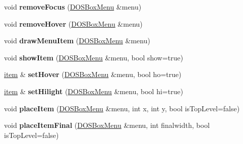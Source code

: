 \begin{DoxyCompactItemize}
\item 
\hypertarget{classDOSBoxMenu_1_1item_acf113ce470d96ee0f12aff8649057d63}{void {\bfseries remove\-Focus} (\hyperlink{classDOSBoxMenu}{D\-O\-S\-Box\-Menu} \&menu)}\label{classDOSBoxMenu_1_1item_acf113ce470d96ee0f12aff8649057d63}

\item 
\hypertarget{classDOSBoxMenu_1_1item_a8e061c47fb38142eef8151d50b0c747d}{void {\bfseries remove\-Hover} (\hyperlink{classDOSBoxMenu}{D\-O\-S\-Box\-Menu} \&menu)}\label{classDOSBoxMenu_1_1item_a8e061c47fb38142eef8151d50b0c747d}

\item 
\hypertarget{classDOSBoxMenu_1_1item_a9560e3719d6f6e0df9cf245765d95090}{void {\bfseries draw\-Menu\-Item} (\hyperlink{classDOSBoxMenu}{D\-O\-S\-Box\-Menu} \&menu)}\label{classDOSBoxMenu_1_1item_a9560e3719d6f6e0df9cf245765d95090}

\item 
\hypertarget{classDOSBoxMenu_1_1item_a2d6c4795f447360fccfc417d72808197}{void {\bfseries show\-Item} (\hyperlink{classDOSBoxMenu}{D\-O\-S\-Box\-Menu} \&menu, bool show=true)}\label{classDOSBoxMenu_1_1item_a2d6c4795f447360fccfc417d72808197}

\item 
\hypertarget{classDOSBoxMenu_1_1item_aa5899f1ccf15bf719729c0f9ebe4fe9d}{\hyperlink{classDOSBoxMenu_1_1item}{item} \& {\bfseries set\-Hover} (\hyperlink{classDOSBoxMenu}{D\-O\-S\-Box\-Menu} \&menu, bool ho=true)}\label{classDOSBoxMenu_1_1item_aa5899f1ccf15bf719729c0f9ebe4fe9d}

\item 
\hypertarget{classDOSBoxMenu_1_1item_acbff5968b026285dd3609cad329b677a}{\hyperlink{classDOSBoxMenu_1_1item}{item} \& {\bfseries set\-Hilight} (\hyperlink{classDOSBoxMenu}{D\-O\-S\-Box\-Menu} \&menu, bool hi=true)}\label{classDOSBoxMenu_1_1item_acbff5968b026285dd3609cad329b677a}

\item 
\hypertarget{classDOSBoxMenu_1_1item_a023f25316ebd1208dae6cfca964dc1f3}{void {\bfseries place\-Item} (\hyperlink{classDOSBoxMenu}{D\-O\-S\-Box\-Menu} \&menu, int x, int y, bool is\-Top\-Level=false)}\label{classDOSBoxMenu_1_1item_a023f25316ebd1208dae6cfca964dc1f3}

\item 
\hypertarget{classDOSBoxMenu_1_1item_af82823304bd3abd5e54b7797e76e34d8}{void {\bfseries place\-Item\-Final} (\hyperlink{classDOSBoxMenu}{D\-O\-S\-Box\-Menu} \&menu, int finalwidth, bool is\-Top\-Level=false)}\label{classDOSBoxMenu_1_1item_af82823304bd3abd5e54b7797e76e34d8}


\end{DoxyCompactItemize}
